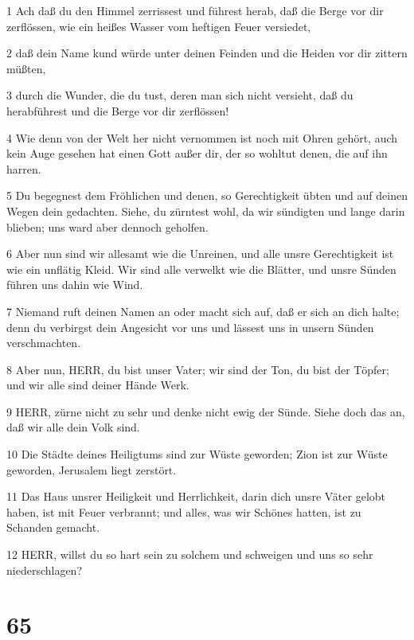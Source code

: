 \par 1 Ach daß du den Himmel zerrissest und führest herab, daß die Berge vor dir zerflössen, wie ein heißes Wasser vom heftigen Feuer versiedet,
\par 2 daß dein Name kund würde unter deinen Feinden und die Heiden vor dir zittern müßten,
\par 3 durch die Wunder, die du tust, deren man sich nicht versieht, daß du herabführest und die Berge vor dir zerflössen!
\par 4 Wie denn von der Welt her nicht vernommen ist noch mit Ohren gehört, auch kein Auge gesehen hat einen Gott außer dir, der so wohltut denen, die auf ihn harren.
\par 5 Du begegnest dem Fröhlichen und denen, so Gerechtigkeit übten und auf deinen Wegen dein gedachten. Siehe, du zürntest wohl, da wir sündigten und lange darin blieben; uns ward aber dennoch geholfen.
\par 6 Aber nun sind wir allesamt wie die Unreinen, und alle unsre Gerechtigkeit ist wie ein unflätig Kleid. Wir sind alle verwelkt wie die Blätter, und unsre Sünden führen uns dahin wie Wind.
\par 7 Niemand ruft deinen Namen an oder macht sich auf, daß er sich an dich halte; denn du verbirgst dein Angesicht vor uns und lässest uns in unsern Sünden verschmachten.
\par 8 Aber nun, HERR, du bist unser Vater; wir sind der Ton, du bist der Töpfer; und wir alle sind deiner Hände Werk.
\par 9 HERR, zürne nicht zu sehr und denke nicht ewig der Sünde. Siehe doch das an, daß wir alle dein Volk sind.
\par 10 Die Städte deines Heiligtums sind zur Wüste geworden; Zion ist zur Wüste geworden, Jerusalem liegt zerstört.
\par 11 Das Haus unsrer Heiligkeit und Herrlichkeit, darin dich unsre Väter gelobt haben, ist mit Feuer verbrannt; und alles, was wir Schönes hatten, ist zu Schanden gemacht.
\par 12 HERR, willst du so hart sein zu solchem und schweigen und uns so sehr niederschlagen?

\chapter{65}

